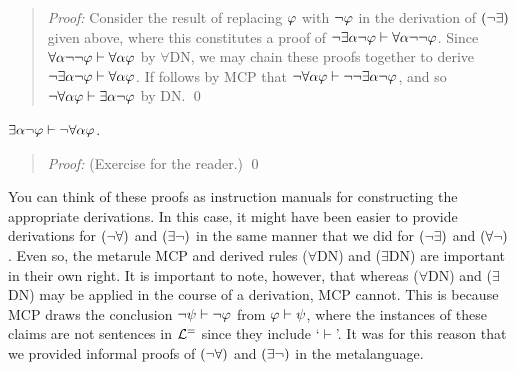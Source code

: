 \begin{quote}
  \textit{Proof:}
  Consider the result of replacing $\varphi$ with $\neg\varphi$ in the derivation of $(\neg\exists)$ given above, where this constitutes a proof of $\neg\exists \alpha\neg\varphi \vdash \forall \alpha\neg\neg\varphi$.
  Since $\forall \alpha\neg\neg\varphi \vdash \forall \alpha\varphi$ by $\forall$DN, we may chain these proofs together to derive $\neg\exists \alpha\neg\varphi \vdash \forall \alpha\varphi$.
  If follows by MCP that $\neg\forall \alpha\varphi \vdash \neg\neg\exists \alpha\neg\varphi$, and so $\neg\forall \alpha\varphi \vdash \exists \alpha\neg\varphi$ by DN. 
  \qed
\end{quote}
  
\begin{Lthm}[$\exists\enot$] \label{lemma:ExistsNot}
     $\exists \alpha\neg\varphi \vdash \neg\forall \alpha\varphi$.
\end{Lthm}

\begin{quote}
  \textit{Proof:}
  (Exercise for the reader.)
  \qed
\end{quote}

You can think of these proofs as instruction manuals for constructing the appropriate derivations.
In this case, it might have been easier to provide derivations for $(\neg\forall)$ and $(\exists\neg)$ in the same manner that we did for $(\neg\exists)$ and $(\forall\neg)$.
Even so, the metarule MCP and derived rules ($\forall$DN) and ($\exists$DN) are important in their own right.
It is important to note, however, that whereas ($\forall$DN) and ($\exists$DN) may be applied in the course of a derivation, MCP cannot.
This is because MCP draws the conclusion $\neg\psi \vdash \neg\varphi$ from $\varphi \vdash \psi$, where the instances of these claims are not sentences in $\mathcal{L}^{=}$ since they include `$\vdash$'.
It was for this reason that we provided informal proofs of $(\neg\forall)$ and $(\exists\neg)$ in the metalanguage. 

